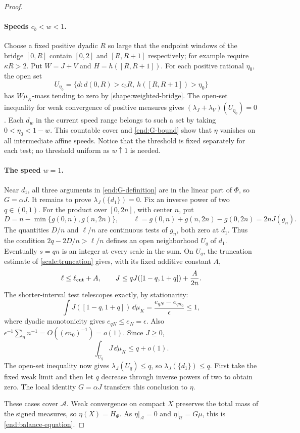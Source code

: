\begin{proof}
\paragraph{Speeds $c_b<w<1$.}
Choose a fixed positive dyadic $R$ so large that the endpoint windows of
the bridge $[0,R]$ contain $[0,2]$ and $[R,R+1]$ respectively; for
example require $\kappa R>2$.  Put $W=J+V$ and
$H=h([R,R+1])$.  For each positive rational $\eta_0$, the open set
\[
 U_{\eta_0}=\{d:d(0,R)>c_bR,\ h([R,R+1])>\eta_0\}
\]
has $W\mu_K$-mass tending to zero by
\cref{shape:weighted-bridge}.  The open-set inequality for weak
convergence of positive measures gives
$(\lambda_J+\lambda_V)(U_{\eta_0})=0$.  Each $d_w$ in the current
speed range belongs to such a set by taking $0<\eta_0<1-w$.
This countable cover and \cref{end:G-bound} show that $\eta$ vanishes
on all intermediate affine speeds.  Notice that the threshold is fixed
separately for each test; no threshold uniform as $w\uparrow1$ is needed.

\paragraph{The speed $w=1$.}
Near $d_1$, all three arguments in \cref{end:G-definition} are in the
linear part of $\Phi$, so $G=\alpha J$.  It remains to prove
$\lambda_J(\{d_1\})=0$.  Fix an inverse power of two $q\in(0,1)$.
For the product over $[0,2n]$, with center $n$, put
\[
 D=n-\min\{g(0,n),g(n,2n)\},\qquad
 \ell=g(0,n)+g(n,2n)-g(0,2n)=2nJ(g_n).
\]
The quantities $D/n$ and $\ell/n$ are continuous tests of $g_n$,
both zero at $d_1$.  Thus the condition
$2q-2D/n>\ell/n$ defines an open neighborhood $U_q$ of $d_1$.
Eventually $s=qn$ is an integer at every scale in the sum.
On $U_q$, the truncation estimate of \cref{scale:truncation} gives,
with its fixed additive constant $A$,
\[
 \ell\le\ell_{\rm cut}+A,
 \qquad
 J\le qJ([1-q,1+q])+\frac{A}{2n}.
\]
The shorter-interval test telescopes exactly, by stationarity:
\[
 \int J([1-q,1+q])\,\dd\mu_K
 =\frac{e_{qN}-e_{qn_0}}\epsilon\le1,
\]
where dyadic monotonicity gives $e_{qN}\le e_N=\epsilon$.
Also $\epsilon^{-1}\sum_n n^{-1}=O((\epsilon n_0)^{-1})=o(1)$.
Since $J\ge0$,
\[
 \int_{U_q}J\,\dd\mu_K\le q+o(1).
\]
The open-set inequality now gives $\lambda_J(U_q)\le q$, so
$\lambda_J(\{d_1\})\le q$.  First take the fixed weak limit and then
let $q$ decrease through inverse powers of two to obtain zero.  The
local identity $G=\alpha J$ transfers this conclusion to $\eta$.

These cases cover $\mathcal A$.  Weak convergence on compact $X$
preserves the total mass of the signed measures, so
$\eta(X)=H_\Phi$.  As $\eta|_{\mathcal A}=0$ and
$\eta|_{\mathcal U}=G\mu$, this is \cref{end:balance-equation}.
\end{proof}

